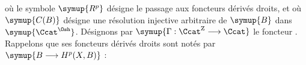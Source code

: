 où le symbole $\symup{R^{p}}$ désigne le passage aux foncteurs dérivés droits, et où
$\symup{C(B)}$ désigne une résolution injective arbitraire de $\symup{B}$ dans $\symup{\Ccat^{\Osh}}$.
Désignons par
$\symup{\Gamma:\Ccat^{\mathrm Z}\longrightarrow\Ccat}$ le foncteur . Rappelons que ses foncteurs dérivés droits sont
notés par $\symup{B\longrightarrow H^{p}(X,B)}$ :



